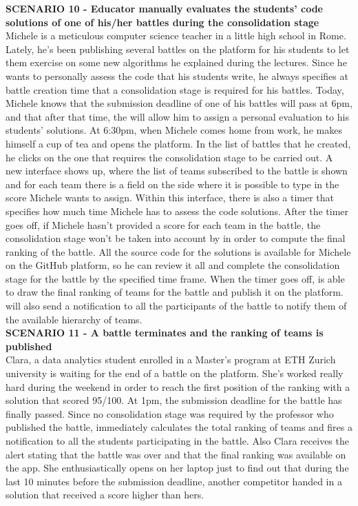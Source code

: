     \textbf{SCENARIO 10 - Educator manually evaluates the students' code solutions of one of his/her battles during the consolidation stage}\\
    Michele is a meticulous computer science teacher in a little high school in Rome. Lately, he's been publishing several battles on the \app platform for his students to let them exercise on some new algorithms he explained during the lectures. Since he wants to personally assess the code that his students write, he always specifies at battle creation time that a consolidation stage is required for his battles. Today, Michele knows that the submission deadline of one of his battles will pass at 6pm, and that after that time, the \app will allow him to assign a personal evaluation to his students' solutions. At 6:30pm, when Michele comes home from work, he makes himself a cup of tea and opens the \app platform. In the list of battles that he created, he clicks on the one that requires the consolidation stage to be carried out. A new interface shows up, where the list of teams subscribed to the battle is shown and for each team there is a field on the side where it is possible to type in the score Michele wants to assign. Within this interface, there is also a timer that specifies how much time Michele has to assess the code solutions. After the timer goes off, if Michele hasn't provided a score for each team in the battle, the consolidation stage won't be taken into account by \app in order to compute the final ranking of the battle.
    All the source code for the solutions is available for Michele on the GitHub platform, so he can review it all and complete the consolidation stage for the battle by the specified time frame.
    When the timer goes off, \app is able to draw the final ranking of teams for the battle and publish it on the platform. \app will also send a notification to all the participants of the battle to notify them of the available hierarchy of teams.\\

	\textbf{SCENARIO 11 - A battle terminates and the ranking of teams is published}\\
	Clara, a data analytics student enrolled in a Master's program at ETH Zurich university is waiting for the end of a battle on the \app platform. She's worked really hard during the weekend in order to reach the first position of the ranking with a solution that scored 95/100. At 1pm, the submission deadline for the battle has finally passed. Since no consolidation stage was required by the professor who published the battle, \app immediately calculates the total ranking of teams and fires a notification to all the students participating in the battle. Also Clara receives the alert stating that the battle was over and that the final ranking was available on the app. She enthusiastically opens \app on her laptop just to find out that during the last 10 minutes before the submission deadline, another competitor handed in a solution that received a score higher than hers.\\ 

